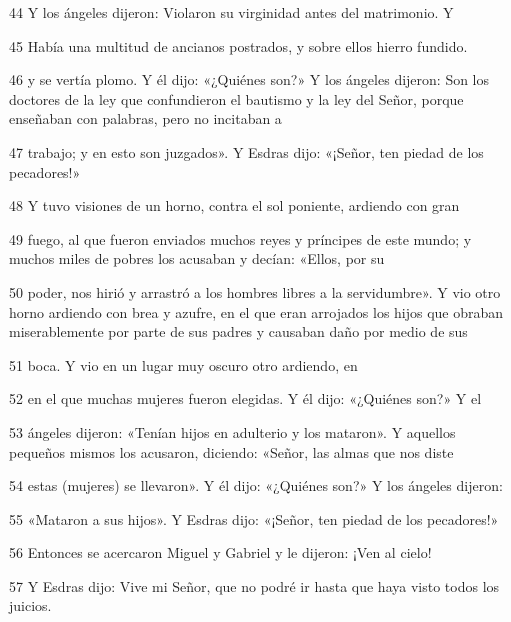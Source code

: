 \par 44 Y los ángeles dijeron: Violaron su virginidad antes del matrimonio. Y

\par 45 Había una multitud de ancianos postrados, y sobre ellos hierro fundido.

\par 46 y se vertía plomo. Y él dijo: «¿Quiénes son?» Y los ángeles dijeron: Son los doctores de la ley que confundieron el bautismo y la ley del Señor, porque enseñaban con palabras, pero no incitaban a

\par 47 trabajo; y en esto son juzgados». Y Esdras dijo: «¡Señor, ten piedad de los pecadores!»

\par 48 Y tuvo visiones de un horno, contra el sol poniente, ardiendo con gran

\par 49 fuego, al que fueron enviados muchos reyes y príncipes de este mundo; y muchos miles de pobres los acusaban y decían: «Ellos, por su

\par 50 poder, nos hirió y arrastró a los hombres libres a la servidumbre». Y vio otro horno ardiendo con brea y azufre, en el que eran arrojados los hijos que obraban miserablemente por parte de sus padres y causaban daño por medio de sus

\par 51 boca. Y vio en un lugar muy oscuro otro ardiendo, en

\par 52 en el que muchas mujeres fueron elegidas. Y él dijo: «¿Quiénes son?» Y el

\par 53 ángeles dijeron: «Tenían hijos en adulterio y los mataron». Y aquellos pequeños mismos los acusaron, diciendo: «Señor, las almas que nos diste

\par 54 estas (mujeres) se llevaron». Y él dijo: «¿Quiénes son?» Y los ángeles dijeron:

\par 55 «Mataron a sus hijos». Y Esdras dijo: «¡Señor, ten piedad de los pecadores!»

\par 56 Entonces se acercaron Miguel y Gabriel y le dijeron: ¡Ven al cielo!

\par 57 Y Esdras dijo: Vive mi Señor, que no podré ir hasta que haya visto todos los juicios.

